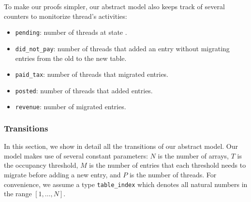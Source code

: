 To make our proofs simpler, our abstract model also keeps track of
several counters to monitorize thread's activities:

\begin{itemize}
\item \texttt{pending}: number of threads at state \pcone.
\item \texttt{did\_not\_pay}: number of threads that added an entry
  without migrating entries from the old to the new table.
\item \texttt{paid\_tax}: number of threads that migrated entries.
\item \texttt{posted}: number of threads that added entries.
\item \texttt{revenue}: number of migrated entries.  
\end{itemize}  

\subsubsection{Transitions}

In this section, we show in detail all the transitions of our abstract
model. Our model makes use of several constant parameters: $N$ is the
number of arrays, $T$ is the occupancy threshold, $M$ is the number of
entries that each threshold needs to migrate before adding a new
entry, and $P$ is the number of threads. For convenience, we assume a
type \texttt{table\_index} which denotes all natural numbers in the
range $[1,\ldots,N]$.


